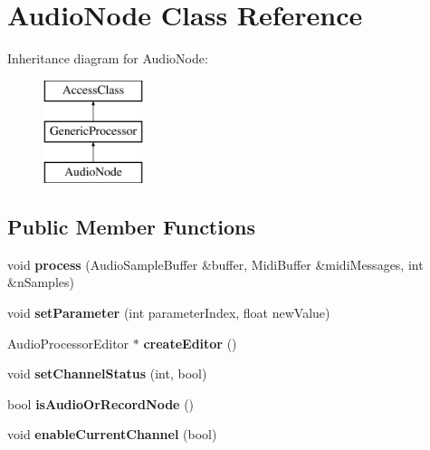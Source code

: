 \hypertarget{classAudioNode}{\section{Audio\-Node Class Reference}
\label{classAudioNode}
}
Inheritance diagram for Audio\-Node\-:\begin{figure}[H]
\begin{center}
\leavevmode
\includegraphics[height=3.000000cm]{classAudioNode}
\end{center}
\end{figure}
\subsection*{Public Member Functions}
\begin{DoxyCompactItemize}
\item 
\hypertarget{classAudioNode_a90d23dc83c27a5ff3a8e5029a5498b35}{void {\bfseries process} (Audio\-Sample\-Buffer \&buffer, Midi\-Buffer \&midi\-Messages, int \&n\-Samples)}\label{classAudioNode_a90d23dc83c27a5ff3a8e5029a5498b35}

\item 
\hypertarget{classAudioNode_a61ca4c81f908093001fd7805951274a2}{void {\bfseries set\-Parameter} (int parameter\-Index, float new\-Value)}\label{classAudioNode_a61ca4c81f908093001fd7805951274a2}

\item 
\hypertarget{classAudioNode_a46c720536cf4b8502d841a65f9dccd1d}{Audio\-Processor\-Editor $\ast$ {\bfseries create\-Editor} ()}\label{classAudioNode_a46c720536cf4b8502d841a65f9dccd1d}

\item 
\hypertarget{classAudioNode_a66b3cdf827054c9fdcdc667918a1f159}{void {\bfseries set\-Channel\-Status} (int, bool)}\label{classAudioNode_a66b3cdf827054c9fdcdc667918a1f159}

\item 
\hypertarget{classAudioNode_ae3ac34b77bc9663868c5739cb891d1a8}{bool {\bfseries is\-Audio\-Or\-Record\-Node} ()}\label{classAudioNode_ae3ac34b77bc9663868c5739cb891d1a8}

\item 
\hypertarget{classAudioNode_a94937d356ee86b72eed82fad0337f9e7}{void {\bfseries enable\-Current\-Channel} (bool)}\label{classAudioNode_a94937d356ee86b72eed82fad0337f9e7}

\end{DoxyCompactItemize}
